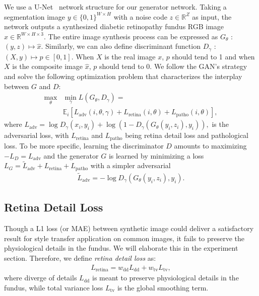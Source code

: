 \documentclass[letterpaper]{article} %
\begin{document}
    We use a U-Net~\cite{ronneberger2015u} network structure for our generator network.%
	Taking a segmentation image $y \in \{ 0,1 \}^{W \times H}$ with a noise code $z \in \mathbb{R}^Z $ as input, the network outputs a synthesized diabetic retinopathy fundus RGB image $\hat{x} \in \mathbb{R}^{W \times H \times 3}$.
	The entire image synthesis process can be expressed as $G_{\theta}$ : $ ( y,z ) \mapsto \hat{x}$. Similarly, we can also define discriminant function $D_{\gamma}$ : $ ( X , y) \mapsto p \in [0,1] $. When $X$ is the real image $x$, $p$ should tend to 1 and when $X$ is the composite image $\hat{x}$, $p$ should tend to 0.
	We follow the GAN's strategy and solve the  following optimization problem that characterizes the interplay between $ G $ and $ D $:
	\begin{align}
	\label{align_allloss} \textstyle
	\max_{\theta} & \textstyle\min_{\gamma} L(G_{\theta}, D_{\gamma}) = \nonumber \\
	&\mathbb{E}_i [L_\mathrm{adv}(i, \theta, \gamma) + L_\mathrm{retina}(i, \theta)
	  + L_\mathrm{patho} (i, \theta)],
	\end{align}
	where $
	L_\mathrm{adv} = \log D_\gamma(x_i, y_i) +
	 \log(1 - D_\gamma(G_\theta(y_i,z_i),y_i)),
	$ is the adversarial loss, with $ L_\mathrm{retina} $ and $ L_\mathrm{patho} $ being retina detail loss and pathological loss.
	To be more specific, learning the discriminator $ D $ amounts to maximizing $ -L_D = L_\mathrm{adv} $
	and the generator $ G $ is learned by minimizing a loss $ L_G = \tilde L_\mathrm{adv} + L_\mathrm{retina} + L_\mathrm{patho} $ with a simpler adversarial
	\begin{align}
	\label{align_Gloss} \textstyle
	\tilde L_\mathrm{adv} = -\log D_\gamma (G_\theta(y_i, z_i),y_i) .
	\end{align}









	\subsection{Retina Detail Loss}
    \label{sec:retina_detail}

    Though a  L1 loss (or MAE) between synthetic image could deliver a satisfactory result for style transfer application on common images, it fails to preserve the physiological details in the fundus. We will elaborate this in the experiment section. Therefore, we define \emph{retina detail loss} as:
	\begin{align}
	\label{align_retina_loss}
	L_\mathrm{retina} = w_\mathrm{dd} L_\mathrm{dd} + w_\mathrm{tv} L_\mathrm{tv},
	\end{align}
	where diverge of details $L_\mathrm{dd}$ is meant to preserve physiological details in the fundus, while total variance loss $L_\mathrm{tv}$ is the global smoothing term.
\end{document}
